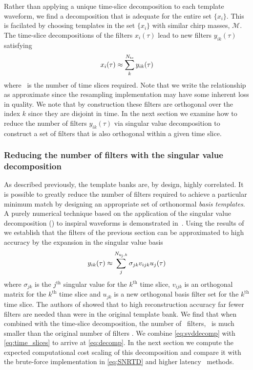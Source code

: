 Rather than applying a unique time-slice decomposition to each template
waveform, we find a decomposition that is adequate for the entire set
$\{x_i\}$.  This is facilated by choosing templates in the set $\{x_i\}$ with
similar chirp masses, $\mathcal{M}$.  The time-slice decompositions of the
filters $x_i(\tau)$ lead to new filters $y_{ik}(\tau)$ satisfying
%
\begin{equation}
\label{eq:time_slices}
x_i(\tau) \approx \sum_k^{{N}_{\mathrm{ts}}} y_{ik}(\tau)
\end{equation}
where \numslices\ is the number of time slices required.  Note that we write
the relationship as approximate since the resampling implementation may have
some inherent loss in quality.  We note that by construction these filters are
orthogonal over the index $k$ since they are disjoint in time.  In the next
section we examine how to reduce the number of filters $y_{ik}(\tau)$ via
singular value decomposition to construct a set of filters that is also
orthogonal within a given time slice.

\subsubsection{Reducing the number of filters with the singular value
decomposition}

As described previously, the template banks are, by design, highly correlated.
It is possible to greatly reduce the number of filters required to achieve a
particular minimum match by designing an appropriate set of orthonormal {\em
basis templates}.  A purely numerical technique based on the application of the
singular value decomposition (\SVD) to inspiral waveforms is demonstrated
in~\cite{Cannon:2010p10398}.  Using the results of ~\cite{Cannon:2010p10398} we
establish that the filters of the previous section can be approximated to high
accuracy by the expansion in the singular value basis
%
\begin{equation}
y_{ik}(\tau) \approx \sum_j^{N_{\mathrm{u_j},k}} \sigma_{jk} v_{ijk} u_{j}(\tau)
\label{eq:svddecomp}
\end{equation}
%
where $\sigma_{jk}$ is the $j^{\mathrm{th}}$ singular value for the
$k^{\mathrm{th}}$ time slice, $v_{ijk}$ is an orthogonal matrix for the
$k^{\mathrm{th}}$ time slice  and $u_{jk}$ is a new orthogonal basis filter set
for the $k^{\mathrm{th}}$ time slice.  The authors of \cite{Cannon:2010p10398}
showed that to high reconstruction accuracy far fewer filters are needed than
were in the original template bank. We find that when combined with the
time-slice decomposition, the number of \SVD\ filters, \numsvdtmps\ is much smaller
than the original number of filters \numtmps.  We combine \eqref{eq:svddecomp}
with \eqref{eq:time_slices} to arrive at \eqref{eq:decomp}.  In the next
section we compute the expected computational cost scaling of this
decomposition and compare it with the brute-force implementation in
\eqref{eq:SNRTD} and higher latency \fft\ methods.

